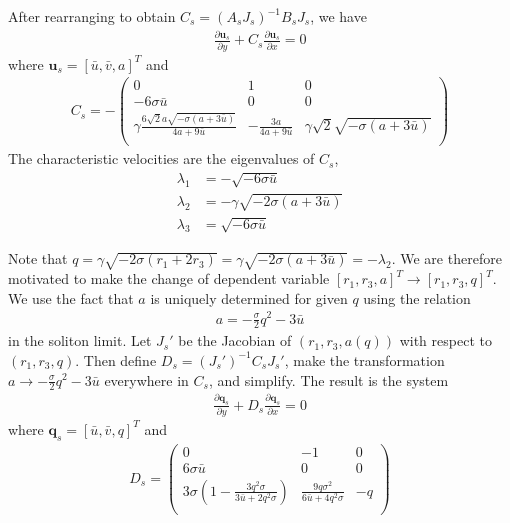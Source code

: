 \documentclass[12pt]{article}
\numberwithin{equation}{section}
\begin{document}
After rearranging to obtain $C_s = (A_sJ_s)^{-1}B_sJ_s$, we have  
\begin{align}
    \frac{\partial \textbf{u}_{s}}{\partial y} + C_s\frac{\partial \textbf{u}_{s}}{\partial x} = 0
\end{align}
where $\textbf{u}_s = [\bar u, \bar v, a]^T$ and 
\begin{align}
    C_s = - \left(
\begin{array}{ccc}
 0 & 1 & 0 \\
 -6 \sigma \bar u & 0 & 0 \\
 \gamma\frac{6 \sqrt{2} a \sqrt{-\sigma(a+3 \bar u)}}{4 a+9 \bar u} & -\frac{3 a}{4 a+9 \bar u} & \gamma \sqrt{2} \sqrt{-\sigma(a+3 \bar u)} \\
\end{array}
\right)
\end{align}
The characteristic velocities are the eigenvalues of $C_s$,
\begin{subequations}
    \begin{align}
        \lambda_1 &= -\sqrt{-6\sigma\bar u} \\
        \lambda_2 &= -\gamma \sqrt{-2\sigma(a+3\bar u)} \\
        \lambda_3 &= \sqrt{-6\sigma\bar u}
     \end{align} \label{char vel ito a}
\end{subequations}

Note that $q = \gamma\sqrt{-2\sigma(r_1+2r_3)} = \gamma\sqrt{-2\sigma(a+3\bar u)} = -\lambda_2$. We are therefore motivated to make the change of dependent variable $[r_1,r_3,a]^T \to [r_1,r_3,q]^T$. We use the fact that $a$ is uniquely determined for given $q$ using the relation
\begin{align}
    a = -\frac{\sigma}{2}q^2 - 3\bar u \label{a(q)} 
\end{align}
in the soliton limit. Let $J_s'$ be the Jacobian of $(r_1,r_3,a(q))$ with respect to $(r_1,r_3,q)$. Then define $D_s = (J_s')^{-1}C_sJ_s'$, make the transformation $a \to -\frac{\sigma}{2}q^2 - 3\bar u$ everywhere in $C_s$, and simplify. The result is the system 
\begin{align}
    \frac{\partial \textbf{q}_{s}}{\partial y} + D_s\frac{\partial \textbf{q}_{s}}{\partial x} = 0 \label{final soliton limit eqn} 
\end{align}
where $\textbf{q}_s = [\bar u, \bar v, q]^T$ and
\begin{align}
    D_s = \left(
\begin{array}{ccc}
 0 & -1 & 0 \\
 6 \sigma  \bar{u} & 0 & 0 \\
 3 \sigma  \left(1-\frac{3 q^2 \sigma }{3 \bar{u}+2 q^2 \sigma }\right) & \frac{9 q \sigma ^2}{6 \bar{u}+4 q^2 \sigma } & -q \\
\end{array}
\right)
\end{align}
\end{document}

